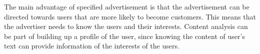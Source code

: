 The main advantage of specified advertisement is that the advertisement can be directed towards users that are more likely to become customers. This means that the advertiser needs to know the users and their interests. Content analysis can be part of building up a profile of the user, since knowing the content of user's text can provide information of the interests of the users. 
